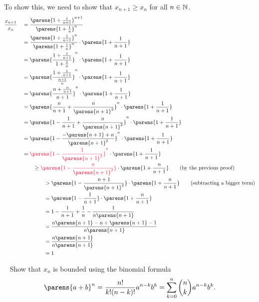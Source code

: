 \begin{problem}
\begin{enumroman}
      \begin{answer}
        To show this, we need to show that $x_{n+1} \geq x_n$ for all $n \in \mathbb{N}$.
        \begin{alignat*}{5}
          &\frac{x_{n+1}}{x_n} &&= \frac{\parens{1 + \frac{1}{n+1}}^{n+1}}{\parens{1 + \frac{1}{n}}^n} \\
          & &&= \frac{\parens{1 + \frac{1}{n+1}}^{n}}{\parens{1 + \frac{1}{n}}^n} \cdot \parens{1 + \frac{1}{n+1}} \\
          & &&= \parens{\frac{1 + \frac{1}{n+1}}{1 + {\frac{1}{n}}}}^n \cdot \parens{1 + \frac{1}{n+1}} \\
          & &&= \parens{\frac{1 + \frac{1}{n+1}}{\frac{n+1}{n}}}^n \cdot \parens{1 + \frac{1}{n+1}} \\
          & &&= \parens{\frac{n + \frac{n}{n+1}}{n+1}}^n \cdot \parens{1 + \frac{1}{n+1}} \\
          & &&= \parens{\frac{n}{n+1} + \frac{n}{\parens{n+1}^2}}^n \cdot \parens{1 + \frac{1}{n+1}} \\
          & &&= \parens{1 - \frac{1}{n+1} + \frac{n}{\parens{n+1}^2}}^n \cdot \parens{1 + \frac{1}{n+1}} \\
          & &&= \parens{1 - \frac{-\parens{n+1} + n}{\parens{n+1}^2}}^n \cdot \parens{1 + \frac{1}{n+1}} \\
          & &&= \crim{\parens{1 - \frac{1}{\parens{n+1}^2}}^n} \cdot \parens{1 + \frac{1}{n+1}} \\
          & &&\qquad \geq \crim{\parens{1 - \frac{n}{\parens{n+1}^2}}} \cdot \parens{1 + \frac{n}{n+1}} \qquad \text{(by the previous proof)} \\
          & &&\qquad \qquad >\parens{1 - \frac{n+1}{\parens{n+1}^2}} \cdot \parens{1 + \frac{n}{n+1}} \qquad \text{(subtracting a bigger term)} \\
          & &&\qquad \qquad = \parens{1 - \frac{1}{n+1}} \cdot \parens{1 + \frac{n}{n+1}} \\
          & &&\qquad \qquad = 1 - \frac{1}{n+1} + \frac{1}{n} - \frac{1}{n\parens{n+1}} \\
          & &&\qquad \qquad = \frac{n\parens{n+1} - n + \parens{n+1} - 1}{n\parens{n+1}} \\
          & &&\qquad \qquad = \frac{n\parens{n+1}}{n\parens{n+1}} \\
          & &&\qquad \qquad = 1
        \end{alignat*}
      \end{answer}

    \newpage
    \item~\label{step:2.3} Show that $x_n$ is bounded using the binomial formula
      \[
        \parens{a + b}^n =
        \frac{n!}{k! (n-k)!} a^{n-k} b^k =
        \sum_{k=0}^n{\binom{n}{k} a^{n-k} b^k}.
      \]
  

\end{enumroman}
\end{problem}
